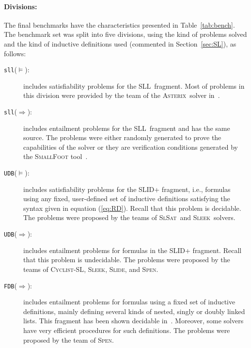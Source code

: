 \documentclass[twoside,11pt]{article}
\newcommand{\limp}{\Rightarrow}
\newcommand{\SLRD}{\textsc{SLID}}
\newcommand{\SLL}{\textsc{SLL}}
\newcommand{\sllsat}{\texttt{sll}($\models$)}
\newcommand{\sllent}{\texttt{sll}($\limp$)}
\newcommand{\FDBent}{\texttt{FDB}($\limp$)}
\newcommand{\UDBsat}{\texttt{UDB}($\models$)}
\newcommand{\UDBent}{\texttt{UDB}($\limp$)}
\newcommand{\ASTERIX}{\textsc{Asterix}}
\newcommand{\CYCLIST}{\textsc{Cyclist-SL}}
\newcommand{\SLEEK}{\textsc{Sleek}}
\newcommand{\SLIDE}{\textsc{Slide}}
\newcommand{\SLSAT}{\textsc{SlSat}}
\newcommand{\SPEN}{\textsc{Spen}}
\begin{document}
\paragraph{Divisions:} The final benchmarks have the characteristics presented in Table~\ref{tab:bench}.
The benchmark set was split into five divisions, using the kind of problems solved and the kind of inductive definitions used (commented in Section~\ref{sec:SL}), as follows:
\begin{description}
\item[\sllsat:] includes satisfiability problems for the \SLL\ fragment.
Most of problems in this division were provided by the team of the \ASTERIX\ solver in~\cite{PerezR11}.

\item[\sllent:] includes entailment problems for the \SLL\ fragment and has the same source. The problems were either randomly generated to prove the capabilities of the solver or they are verification conditions generated by the \textsc{SmallFoot} tool~\cite{SmallFootsite}.

\item[\UDBsat:] includes satisfiability problems for the \SLRD+ fragment, i.e., formulas using any fixed, user-defined set of inductive definitions satisfying the syntax given in equation (\ref{eq:RD}).
Recall that this problem is decidable. 
The problems were proposed by the teams of \SLSAT\ and \SLEEK\ solvers.

\item[\UDBent:] includes entailment problems for formulas in the \SLRD+ fragment.
Recall that this problem is undecidable. 
The problems were proposed by the teams of \CYCLIST, \SLEEK, \SLIDE, and \SPEN.

\item[\FDBent:] includes entailment problems for formulas using a fixed set of inductive definitions, mainly defining several kinds of nested, singly or doubly linked lists. This fragment has been shown decidable in~\cite{AntonopoulosGHKO14,EneaLSV14}.
Moreover, some solvers have very efficient procedures for such definitions.
The problems were proposed by the team of \SPEN.
\end{description} 
 
\end{document}
